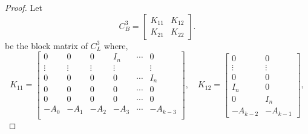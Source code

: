 \documentclass [12pt]{article}
\begin{document}
\begin{proof}
 Let 
\[
C^{3}_{B} = \begin{bmatrix} K_{11} & K_{12} \\ K_{21} & K_{22} \end{bmatrix}.
\] be the block matrix of $C^{3}_{L}$
where,
\[
K_{11} = 
\begin{bmatrix}
0 & 0 & 0& I_n & \cdots & 0 \\
\vdots & \vdots& \vdots  & \vdots &  &\vdots\\
0 & 0 & 0 & 0&\cdots & I_n \\
0 & 0 & 0 & 0&\cdots & 0 \\
0 & 0 & 0 & 0&\cdots & 0 \\
-A_0 & -A_1 & -A_2 & -A_{3}&\cdots & -A_{k-3} \\
\end{bmatrix}, \quad K_{12} = 
\begin{bmatrix}
0 & 0\\
\vdots& \vdots \\
0&0\\
I_{n}&0\\
0&I_{n}\\
-A_{k-2}&-A_{k-1}

\end{bmatrix},
\]


\end{proof}
\end{document}
